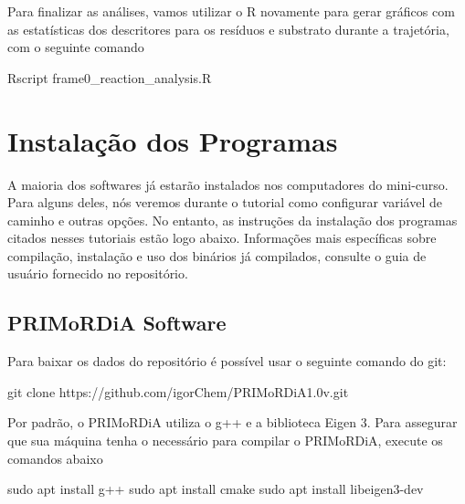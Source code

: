 \documentclass[a4paper,11pt]{refart}
\begin{document}
	Para finalizar as análises, vamos utilizar o R novamente para gerar gráficos com as estatísticas dos descritores para os resíduos e substrato durante a trajetória, com o seguinte comando 

	\hspace*{-\leftmarginwidth}
	\begin{minipage}{\fullwidth}
		\begin{commandshell}Rscript frame0\_reaction\_analysis.R\end{commandshell}
	\end{minipage}
	
	\section{Instalação dos Programas}
	
	A maioria dos softwares já estarão instalados nos computadores do mini-curso. Para alguns deles, nós veremos durante o tutorial como configurar variável de caminho e outras opções. No entanto, as instruções da instalação dos  programas citados nesses tutoriais  estão logo abaixo. Informações mais específicas sobre compilação, instalação e uso dos binários já compilados, consulte o guia de usuário fornecido no repositório. 
	
	\subsection{PRIMoRDiA Software}
	
	Para baixar os dados do repositório é possível usar o seguinte comando do git:
	
\hspace*{-\leftmarginwidth}
\begin{minipage}{\fullwidth}
\begin{commandshell}git clone https://github.com/igorChem/PRIMoRDiA1.0v.git\end{commandshell}
\end{minipage}
	
	Por padrão, o PRIMoRDiA utiliza o g++ e a biblioteca Eigen 3. Para assegurar que sua máquina tenha o necessário para compilar o PRIMoRDiA, execute os comandos abaixo
	
\hspace*{-\leftmarginwidth}
\begin{minipage}{\fullwidth}
\begin{commandshell}sudo apt install g++
sudo apt install cmake	
sudo apt install libeigen3-dev
\end{commandshell}
\end{minipage}
\end{document}
